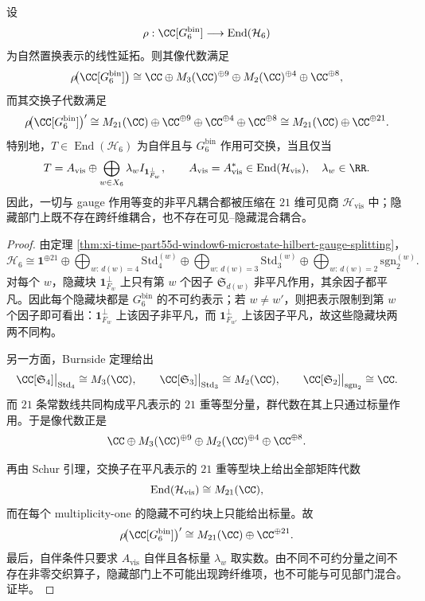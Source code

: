 \begin{theorem}[规范作用像代数与交换子代数的双侧刚性]\label{thm:xi-time-part55d-window6-action-image-commutant-rigidity}
设
\[
\rho:\CC[G_6^{\mathrm{bin}}]\longrightarrow \operatorname{End}(\mathcal H_6)
\]
为自然置换表示的线性延拓。则其像代数满足
\[
\rho\!\bigl(\CC[G_6^{\mathrm{bin}}]\bigr)
\cong
\CC
\oplus
M_3(\CC)^{\oplus 9}
\oplus
M_2(\CC)^{\oplus 4}
\oplus
\CC^{\oplus 8},
\]
而其交换子代数满足
\[
\rho\!\bigl(\CC[G_6^{\mathrm{bin}}]\bigr)'
\cong
M_{21}(\CC)
\oplus
\CC^{\oplus 9}
\oplus
\CC^{\oplus 4}
\oplus
\CC^{\oplus 8}
\cong
M_{21}(\CC)\oplus \CC^{\oplus 21}.
\]
特别地，\(T\in \operatorname{End}(\mathcal H_6)\) 为自伴且与 \(G_6^{\mathrm{bin}}\) 作用可交换，当且仅当
\[
T
=
A_{\mathrm{vis}}
\oplus
\bigoplus_{w\in X_6}\lambda_w I_{\mathbf 1_{F_w}^{\perp}},
\qquad
A_{\mathrm{vis}}=A_{\mathrm{vis}}^*\in \operatorname{End}(\mathcal H_{\mathrm{vis}}),
\quad
\lambda_w\in \RR.
\]
因此，一切与 gauge 作用等变的非平凡耦合都被压缩在 \(21\) 维可见商 \(\mathcal H_{\mathrm{vis}}\) 中；隐藏部门上既不存在跨纤维耦合，也不存在可见--隐藏混合耦合。
\end{theorem}
\begin{proof}
由定理 \ref{thm:xi-time-part55d-window6-microstate-hilbert-gauge-splitting}，
\[
\mathcal H_6
\cong
\mathbf 1^{\oplus 21}
\oplus
\bigoplus_{w:\,d(w)=4}\mathrm{Std}_4^{(w)}
\oplus
\bigoplus_{w:\,d(w)=3}\mathrm{Std}_3^{(w)}
\oplus
\bigoplus_{w:\,d(w)=2}\mathrm{sgn}_2^{(w)}.
\]
对每个 \(w\)，隐藏块 \(\mathbf 1_{F_w}^{\perp}\) 上只有第 \(w\) 个因子 \(\mathfrak S_{d(w)}\) 非平凡作用，其余因子都平凡。因此每个隐藏块都是 \(G_6^{\mathrm{bin}}\) 的不可约表示；若 \(w\neq w'\)，则把表示限制到第 \(w\) 个因子即可看出：\(\mathbf 1_{F_w}^{\perp}\) 上该因子非平凡，而 \(\mathbf 1_{F_{w'}}^{\perp}\) 上该因子平凡，故这些隐藏块两两不同构。

另一方面，Burnside 定理给出
\[
\CC[\mathfrak S_4]\big|_{\mathrm{Std}_4}\cong M_3(\CC),
\qquad
\CC[\mathfrak S_3]\big|_{\mathrm{Std}_3}\cong M_2(\CC),
\qquad
\CC[\mathfrak S_2]\big|_{\mathrm{sgn}_2}\cong \CC.
\]
而 \(21\) 条常数线共同构成平凡表示的 \(21\) 重等型分量，群代数在其上只通过标量作用。于是像代数正是
\[
\CC
\oplus
M_3(\CC)^{\oplus 9}
\oplus
M_2(\CC)^{\oplus 4}
\oplus
\CC^{\oplus 8}.
\]

再由 Schur 引理，交换子在平凡表示的 \(21\) 重等型块上给出全部矩阵代数
\[
\operatorname{End}(\mathcal H_{\mathrm{vis}})\cong M_{21}(\CC),
\]
而在每个 multiplicity-one 的隐藏不可约块上只能给出标量。故
\[
\rho\!\bigl(\CC[G_6^{\mathrm{bin}}]\bigr)'
\cong
M_{21}(\CC)\oplus \CC^{\oplus 21}.
\]
最后，自伴条件只要求 \(A_{\mathrm{vis}}\) 自伴且各标量 \(\lambda_w\) 取实数。由不同不可约分量之间不存在非零交织算子，隐藏部门上不可能出现跨纤维项，也不可能与可见部门混合。证毕。
\end{proof}

